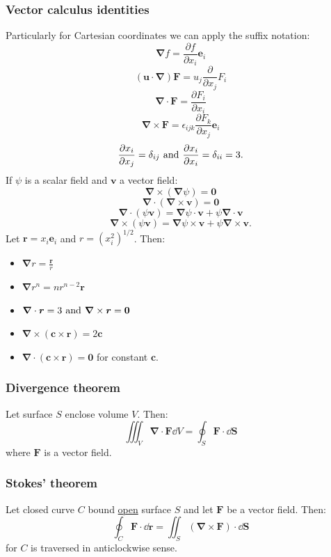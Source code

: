 \documentclass{article}
\newcommand{\vc}[1]{\boldsymbol{#1}}
\begin{document}
\begin{multicols*}{3}
\subsubsection*{Vector calculus identities}
Particularly for Cartesian coordinates
we can apply the suffix notation:
$$\vc{\nabla}f=
\frac{\partial f}{\partial x_i}\vc{e}_i$$
$$(\vc{u}\cdot\vc{\nabla})\vc{F}
=u_j\frac{\partial}{\partial x_j}F_i$$
$$\vc{\nabla}\cdot\vc{F}=
\frac{\partial F_i}{\partial x_i}$$
$$\vc{\nabla}\times\vc{F}
=\epsilon_{ijk}\frac{\partial F_k}{\partial x_j}
\vc{e}_i$$
$$\frac{\partial x_i}{\partial x_j}=\delta_{ij}
\hspace{0.05in}\text{and}\hspace{0.05in}
\frac{\partial x_i}{\partial x_i}=\delta_{ii}=3.$$
If $\psi$ is a scalar field and $\vc{v}$ a vector field:
$$\vc{\nabla}\times(\vc{\nabla}\psi)=\vc{0}$$
$$\vc{\nabla}\cdot(\vc{\nabla}\times\vc{v})=\vc{0}$$
$$\vc{\nabla}\cdot(\psi\vc{v})
=\vc{\nabla}\psi\cdot\vc{v}+\psi\vc{\nabla}\cdot\vc{v}$$
$$\vc{\nabla}\times(\psi\vc{v})
=\vc{\nabla}\psi\times\vc{v}+\psi\vc{\nabla}\times\vc{v}.$$
Let $\vc{r}=x_i\vc{e}_i$ and $r=(x_i^2)^{1/2}$. Then:
\begin{itemize}
    \item $\displaystyle\vc{\nabla}r=\frac{\vc{r}}{r}$
    
    \item $\displaystyle\vc{\nabla}r^n
    =n r^{n-2}\vc{r}$
    
    \item $\displaystyle\vc{\nabla}\cdot\vc{r}=3
    \hspace{0.05in}\text{and}\hspace{0.05in}
    \vc{\nabla}\times\vc{r}=\vc{0}$

    \item $\displaystyle\vc{\nabla}\times
    (\vc{c}\times\vc{r})=2\vc{c}$
    
    \item $\displaystyle\vc{\nabla}
    \cdot(\vc{c}\times\vc{r})=\vc{0}$
    for constant $\vc{c}$.
\end{itemize}

\subsubsection*{Divergence theorem}
Let surface $S$ enclose volume $V$. Then:
$$\iiint_V \vc{\nabla}\cdot\vc{F}\dd V
=\oint_S \vc{F}\cdot\dd\vc{S}$$
where $\vc{F}$ is a vector field.

\subsubsection*{Stokes' theorem}
Let closed curve $C$ bound \underline{open} surface $S$
and let $\vc{F}$ be a vector field. Then:
$$\oint_C \vc{F}\cdot\dd\vc{r}
=\iint_S (\vc{\nabla}\times\vc{F})\cdot\dd\vc{S}$$
for $C$ is traversed in anticlockwise sense.


\end{multicols*}
\end{document}
